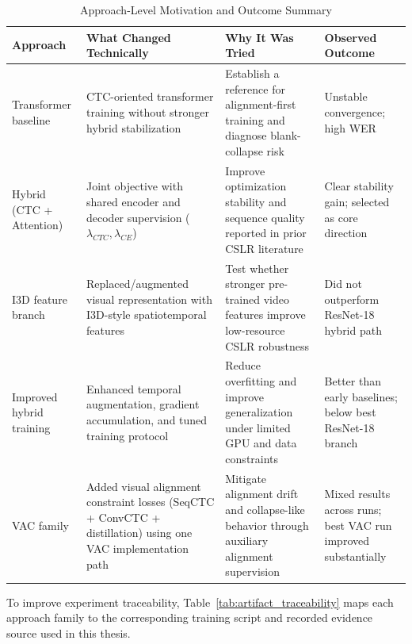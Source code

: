 \begin{table}[H]
\centering
\caption{Approach-Level Motivation and Outcome Summary}
\label{tab:approach_mapping}
\begingroup
\small
\setlength{\tabcolsep}{4pt}
\begin{tabularx}{\textwidth}{@{}p{2.3cm}X X p{2.2cm}@{}}
\toprule
\textbf{Approach} & \textbf{What Changed Technically} & \textbf{Why It Was Tried} & \textbf{Observed Outcome} \\
\midrule
Transformer baseline & CTC-oriented transformer training without stronger hybrid stabilization & Establish a reference for alignment-first training and diagnose blank-collapse risk & Unstable convergence; high WER \\

Hybrid (CTC + Attention) & Joint objective with shared encoder and decoder supervision ($\lambda_{CTC}, \lambda_{CE}$) & Improve optimization stability and sequence quality reported in prior CSLR literature & Clear stability gain; selected as core direction \\

I3D feature branch & Replaced/augmented visual representation with I3D-style spatiotemporal features & Test whether stronger pre-trained video features improve low-resource CSLR robustness & Did not outperform ResNet-18 hybrid path \\

Improved hybrid training & Enhanced temporal augmentation, gradient accumulation, and tuned training protocol & Reduce overfitting and improve generalization under limited GPU and data constraints & Better than early baselines; below best ResNet-18 branch \\

VAC family & Added visual alignment constraint losses (SeqCTC + ConvCTC + distillation) using one VAC implementation path & Mitigate alignment drift and collapse-like behavior through auxiliary alignment supervision & Mixed results across runs; best VAC run improved substantially \\
\bottomrule
\end{tabularx}
\endgroup
\end{table}

To improve experiment traceability, Table~\ref{tab:artifact_traceability} maps each approach family to the corresponding training script and recorded evidence source used in this thesis.

